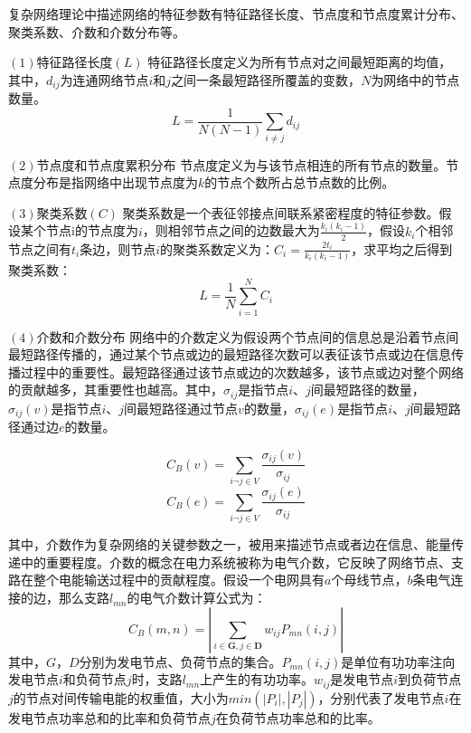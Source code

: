 复杂网络理论中描述网络的特征参数有特征路径长度、节点度和节点度累计分布、聚类系数、介数和介数分布等。

$(1)$特征路径长度$(L)$
特征路径长度定义为所有节点对之间最短距离的均值，其中，$d_{ij}$为连通网络节点$i$和$j$之间一条最短路径所覆盖的变数，$N$为网络中的节点数量。
\begin{equation}
\label{equ:chap3:Index01}
L=\displaystyle\frac{1}{N(N-1)}\sum_{i\neq j}d_{ij}
\end{equation}

$(2)$节点度和节点度累积分布
节点度定义为与该节点相连的所有节点的数量。节点度分布是指网络中出现节点度为$k$的节点个数所占总节点数的比例。

$(3)$聚类系数$(C)$
聚类系数是一个表征邻接点间联系紧密程度的特征参数。假设某个节点i的节点度为$i$，则相邻节点之间的边数最大为$\frac{k_i(k_i-1)}{2}$，假设$k_i$个相邻节点之间有$t_i$条边，则节点$i$的聚类系数定义为：$C_i=\frac{2t_i}{k_i(k_i-1)}$，求平均之后得到聚类系数：
\begin{equation}
\label{equ:chap3:Index02}
L=\displaystyle\frac{1}{N}\sum_{i=1}^{N}C_i
\end{equation}

$(4)$介数和介数分布
网络中的介数定义为假设两个节点间的信息总是沿着节点间最短路径传播的，通过某个节点或边的最短路径次数可以表征该节点或边在信息传播过程中的重要性。最短路径通过该节点或边的次数越多，该节点或边对整个网络的贡献越多，其重要性也越高。其中，$\sigma_{ij}$是指节点$i$、$j$间最短路径的数量，$\sigma_{ij}(v)$是指节点$i$、$j$间最短路径通过节点$v$的数量，$\sigma_{ij}(e)$是指节点$i$、$j$间最短路径通过边$e$的数量。

\begin{equation}
\label{equ:chap3:Index03}
C_B(v)=\sum_{i\neg j \in V}\displaystyle\frac{\sigma_{ij}(v)}{\sigma_{ij}}
\end{equation}
\begin{equation}
\label{equ:chap3:Index04}
C_B(e)=\sum_{i\neg j \in V}\displaystyle\frac{\sigma_{ij}(e)}{\sigma_{ij}}
\end{equation}

其中，介数作为复杂网络的关键参数之一，被用来描述节点或者边在信息、能量传递中的重要程度。介数的概念在电力系统被称为电气介数，它反映了网络节点、支路在整个电能输送过程中的贡献程度。假设一个电网具有$a$个母线节点，$b$条电气连接的边，那么支路$l_{mn}$的电气介数计算公式为：
\begin{equation}
\label{equ:chap3:Index1}
C_{B}(m,n)=\left|\sum_{i\in\mathbf{G},j\in\mathbf{D}}w_{ij}P_{mn}(i,j)\right|
\end{equation}
其中，$G$，$D$分别为发电节点、负荷节点的集合。$P_{mn}(i,j)$是单位有功功率注向发电节点$i$和负荷节点$j$时，支路$l_{mn}$上产生的有功功率。$w_{ij}$是发电节点$i$到负荷节点$j$的节点对间传输电能的权重值，大小为$min(|P_i|,|P_j|)$，分别代表了发电节点$i$在发电节点功率总和的比率和负荷节点$j$在负荷节点功率总和的比率。

